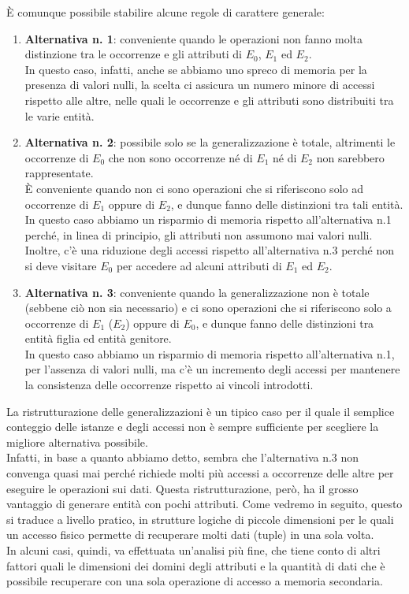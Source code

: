 È comunque possibile stabilire alcune regole di carattere generale:
    \begin{enumerate}
        \item{\textbf{Alternativa n. 1}: conveniente quando le operazioni non fanno molta distinzione tra le occorrenze e gli attributi di $E_0$, $E_1$ ed $E_2$.\\
        In questo caso, infatti, anche se abbiamo uno spreco di memoria per la presenza di valori nulli, la scelta ci assicura un numero minore di accessi rispetto alle altre, nelle quali le occorrenze e gli attributi sono distribuiti tra le varie entità.}
        \item{\textbf{Alternativa n. 2}: possibile solo se la generalizzazione è totale, altrimenti le occorrenze di $E_0$ che non sono occorrenze né di $E_1$ né di $E_2$ non sarebbero rappresentate.\\
        È conveniente quando non ci sono operazioni che si riferiscono solo ad occorrenze di $E_1$ oppure di $E_2$, e dunque fanno delle distinzioni tra tali entità.\\
        In questo caso abbiamo un risparmio di memoria rispetto all'alternativa n.1 perché, in linea di principio, gli attributi non assumono mai valori nulli. Inoltre, c'è una riduzione degli accessi rispetto all'alternativa n.3 perché non si deve visitare $E_0$ per accedere ad alcuni attributi di $E_1$ ed $E_2$.}
        \item{\textbf{Alternativa n. 3}: conveniente quando la generalizzazione non è totale (sebbene ciò non sia necessario) e ci sono operazioni che si riferiscono solo a occorrenze di $E_1$ ($E_2$) oppure di $E_0$, e dunque fanno delle distinzioni tra entità figlia ed entità genitore.\\
        In questo caso abbiamo un risparmio di memoria rispetto all'alternativa n.1, per l'assenza di valori nulli, ma c'è un incremento degli accessi per mantenere la consistenza delle occorrenze rispetto ai vincoli introdotti.}
    \end{enumerate}
La ristrutturazione delle generalizzazioni è un tipico caso per il quale il semplice conteggio delle istanze e degli accessi non è sempre sufficiente per scegliere la migliore alternativa possibile.\\
Infatti, in base a quanto abbiamo detto, sembra che l'alternativa n.3 non convenga quasi mai perché richiede molti più accessi a occorrenze delle altre per eseguire le operazioni sui dati. Questa ristrutturazione, però, ha il grosso vantaggio di generare entità con pochi attributi. Come vedremo in seguito, questo si traduce a livello pratico, in strutture logiche di piccole dimensioni per le quali un accesso fisico permette di recuperare molti dati (tuple) in una sola volta.\\
In alcuni casi, quindi, va effettuata un'analisi più fine, che tiene conto di altri fattori quali le dimensioni dei domini degli attributi e la quantità di dati che è possibile recuperare con una sola operazione di accesso a memoria secondaria. 
    
